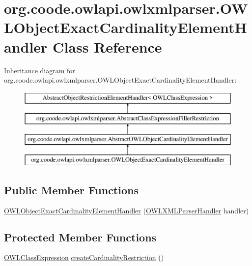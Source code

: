 \hypertarget{classorg_1_1coode_1_1owlapi_1_1owlxmlparser_1_1_o_w_l_object_exact_cardinality_element_handler}{\section{org.\-coode.\-owlapi.\-owlxmlparser.\-O\-W\-L\-Object\-Exact\-Cardinality\-Element\-Handler Class Reference}
\label{classorg_1_1coode_1_1owlapi_1_1owlxmlparser_1_1_o_w_l_object_exact_cardinality_element_handler}
}
Inheritance diagram for org.\-coode.\-owlapi.\-owlxmlparser.\-O\-W\-L\-Object\-Exact\-Cardinality\-Element\-Handler\-:\begin{figure}[H]
\begin{center}
\leavevmode
\includegraphics[height=4.000000cm]{classorg_1_1coode_1_1owlapi_1_1owlxmlparser_1_1_o_w_l_object_exact_cardinality_element_handler}
\end{center}
\end{figure}
\subsection*{Public Member Functions}
\begin{DoxyCompactItemize}
\item 
\hyperlink{classorg_1_1coode_1_1owlapi_1_1owlxmlparser_1_1_o_w_l_object_exact_cardinality_element_handler_a9d469c64db24782099fabe66203560d4}{O\-W\-L\-Object\-Exact\-Cardinality\-Element\-Handler} (\hyperlink{classorg_1_1coode_1_1owlapi_1_1owlxmlparser_1_1_o_w_l_x_m_l_parser_handler}{O\-W\-L\-X\-M\-L\-Parser\-Handler} handler)
\end{DoxyCompactItemize}
\subsection*{Protected Member Functions}
\begin{DoxyCompactItemize}
\item 
\hyperlink{interfaceorg_1_1semanticweb_1_1owlapi_1_1model_1_1_o_w_l_class_expression}{O\-W\-L\-Class\-Expression} \hyperlink{classorg_1_1coode_1_1owlapi_1_1owlxmlparser_1_1_o_w_l_object_exact_cardinality_element_handler_a13ef162a25c3105f1ed1c22f6a1886f6}{create\-Cardinality\-Restriction} ()
\end{DoxyCompactItemize}


